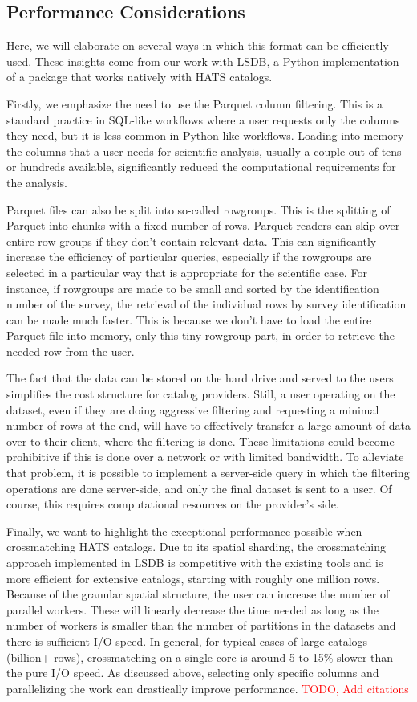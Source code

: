 \documentclass[11pt,a4paper]{ivoa}
\begin{document}
    \subsection{Performance Considerations}
      Here, we will elaborate on several ways in which this format can be efficiently used. These insights come from our work with LSDB, a Python implementation of a package that works natively with HATS catalogs. \par
        Firstly, we emphasize the need to use the Parquet column filtering. This is a standard practice in SQL-like workflows where a user requests only the columns they need, but it is less common in Python-like workflows. Loading into memory the columns that a user needs for scientific analysis, usually a couple out of tens or hundreds available, significantly reduced the computational requirements for the analysis.  \par 
     Parquet files can also be split into so-called rowgroups. This is the splitting of Parquet into chunks with a fixed number of rows. Parquet readers can skip over entire row groups if they don't contain relevant data. This can significantly increase the efficiency of particular queries, especially if the rowgroups are selected in a particular way that is appropriate for the scientific case. For instance, if rowgroups are made to be small and sorted by the identification number of the survey, the retrieval of the individual rows by survey identification can be made much faster. This is because we don't have to load the entire Parquet file into memory, only this tiny rowgroup part, in order to retrieve the needed row from the user. \par 
    The fact that the data can be stored on the hard drive and served to the users simplifies the cost structure for catalog providers. Still, a user operating on the dataset, even if they are doing aggressive filtering and requesting a minimal number of rows at the end, will have to effectively transfer a large amount of data over to their client, where the filtering is done. These limitations could become prohibitive if this is done over a network or with limited bandwidth. To alleviate that problem, it is possible to implement a server-side query in which the filtering operations are done server-side, and only the final dataset is sent to a user. Of course, this requires computational resources on the provider's side. \par 
   Finally, we want to highlight the exceptional performance possible when crossmatching HATS catalogs. Due to its spatial sharding, the crossmatching approach implemented in LSDB is competitive with the existing tools and is more efficient for extensive catalogs, starting with roughly one million rows. Because of the granular spatial structure, the user can increase the number of parallel workers. These will linearly decrease the time needed as long as the number of workers is smaller than the number of partitions in the datasets and there is sufficient I/O speed. In general, for typical cases of large catalogs (billion+ rows), crossmatching on a single core is around 5 to 15\% slower than the pure I/O speed. As discussed above, selecting only specific columns and parallelizing the work can drastically improve performance.   
    \textcolor{red}{TODO, Add citations } 
\appendix
\end{document}
